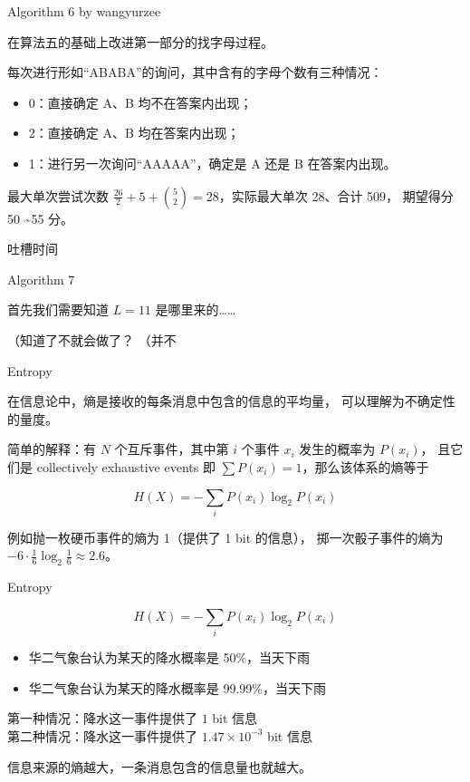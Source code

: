 \documentclass[UTF8]{beamer}
\begin{document}
\begin{frame}{Algorithm 6 by wangyurzee}

在算法五的基础上改进第一部分的找字母过程。

\pause 每次进行形如“ABABA”的询问，其中含有的字母个数有三种情况：
\begin{itemize}
    \item 0：直接确定 A、B 均不在答案内出现；
    \item 2：直接确定 A、B 均在答案内出现；
    \item 1：进行另一次询问“AAAAA”，确定是 A 还是 B 在答案内出现。
\end{itemize} 

\pause 最大单次尝试次数 $\frac{26}{2} + 5 + \binom{5}{2} = 28$，实际最大单次 28、合计 509，
期望得分 50 \textasciitilde 55 分。

\end{frame}

\begin{frame}{吐槽时间}
\end{frame}

\begin{frame}{Algorithm 7}

首先我们需要知道 $L = 11$ 是哪里来的……

\pause （知道了不就会做了？
\pause （并不

\end{frame}

\begin{frame}{Entropy}


在信息论中，熵是接收的每条消息中包含的信息的平均量，%
可以理解为不确定性的量度。

简单的解释：有 $N$ 个互斥事件，其中第 $i$ 个事件 $x_i$ 发生的概率为 $P(x_i)$，
且它们是 collectively exhaustive events 即 $\sum P(x_i) = 1$，那么该体系的熵等于

$$
    H(X) = -\sum_{i} P(x_i) \log_2 P(x_i)
$$

例如抛一枚硬币事件的熵为 1（提供了 1 bit 的信息），%
掷一次骰子事件的熵为 $-6 \cdot \frac{1}{6} \log_2 \frac{1}{6} \approx 2.6$。

\end{frame}

\begin{frame}{Entropy}

$$
    H(X) = -\sum_{i} P(x_i) \log_2 P(x_i)
$$

\begin{itemize}
    \item {}华二气象台认为某天的降水概率是 50\%，当天下雨
    \item {}华二气象台认为某天的降水概率是 99.99\%，当天下雨
\end{itemize}

\pause
第一种情况：降水这一事件提供了 $1$ bit 信息\\
第二种情况：降水这一事件提供了 $1.47 \times 10^{-3}$ bit 信息 \newline\newline

信息来源的熵越大，一条消息包含的信息量也就越大。

\end{frame}
\end{document}
